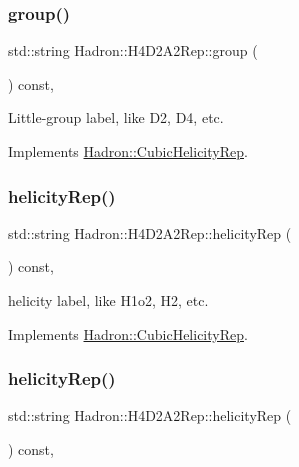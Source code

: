 \subsubsection{\texorpdfstring{group()}{group()}\hspace{0.1cm}{\footnotesize\ttfamily [5/5]}}
{\footnotesize\ttfamily std\+::string Hadron\+::\+H4\+D2\+A2\+Rep\+::group (\begin{DoxyParamCaption}{ }\end{DoxyParamCaption}) const\hspace{0.3cm}{\ttfamily [inline]}, {\ttfamily [virtual]}}

Little-\/group label, like D2, D4, etc. 

Implements \mbox{\hyperlink{structHadron_1_1CubicHelicityRep_a101a7d76cd8ccdad0f272db44b766113}{Hadron\+::\+Cubic\+Helicity\+Rep}}.

\mbox{\label{structHadron_1_1H4D2A2Rep_acefae4ce29aeb8f45ae4976209500037}} 
\subsubsection{\texorpdfstring{helicityRep()}{helicityRep()}\hspace{0.1cm}{\footnotesize\ttfamily [1/3]}}
{\footnotesize\ttfamily std\+::string Hadron\+::\+H4\+D2\+A2\+Rep\+::helicity\+Rep (\begin{DoxyParamCaption}{ }\end{DoxyParamCaption}) const\hspace{0.3cm}{\ttfamily [inline]}, {\ttfamily [virtual]}}

helicity label, like H1o2, H2, etc. 

Implements \mbox{\hyperlink{structHadron_1_1CubicHelicityRep_af1096946b7470edf0a55451cc662f231}{Hadron\+::\+Cubic\+Helicity\+Rep}}.

\mbox{\label{structHadron_1_1H4D2A2Rep_acefae4ce29aeb8f45ae4976209500037}} 
\subsubsection{\texorpdfstring{helicityRep()}{helicityRep()}\hspace{0.1cm}{\footnotesize\ttfamily [2/3]}}
{\footnotesize\ttfamily std\+::string Hadron\+::\+H4\+D2\+A2\+Rep\+::helicity\+Rep (\begin{DoxyParamCaption}{ }\end{DoxyParamCaption}) const\hspace{0.3cm}{\ttfamily [inline]}, {\ttfamily [virtual]}}

